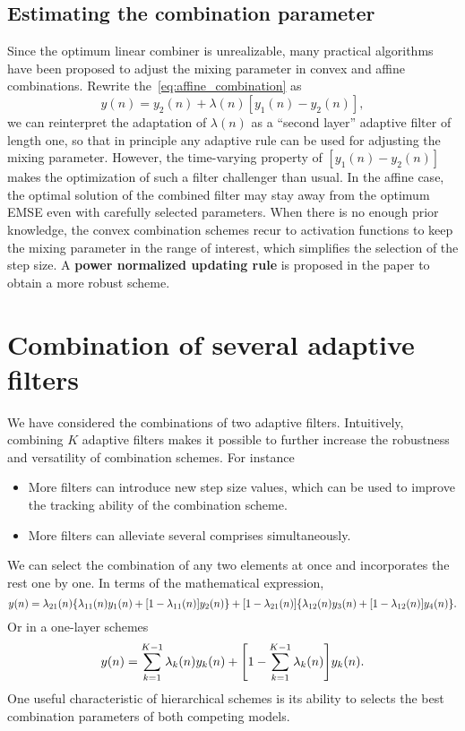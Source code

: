 \documentclass{article}
\begin{document}
\subsection{Estimating the combination parameter}\label{sec:estimating}
Since the optimum linear combiner is unrealizable, many practical algorithms have been proposed to adjust the mixing parameter in convex and affine combinations. Rewrite the~\cref{eq:affine_combination} as
\begin{equation}
    y(n) = y_2(n)+\lambda(n)[y_1(n)-y_2(n)],
\end{equation}
we can reinterpret the adaptation of $\lambda(n)$ as a ``second layer'' adaptive filter of length one, so that in principle any adaptive rule can be used for adjusting the mixing parameter. However, the time-varying property of $[y_1(n)-y_2(n)]$ makes the optimization of such a filter challenger than usual. In the affine case, the optimal solution of the combined filter may stay away from the optimum EMSE even with carefully selected parameters. When there is no enough prior knowledge, the convex combination schemes recur to activation functions to keep the mixing parameter in the range of interest, which simplifies the selection of the step size. A \textbf{power normalized updating rule} is proposed in the paper to obtain a more robust scheme.

\section{Combination of several adaptive filters}
We have considered the combinations of two adaptive filters. Intuitively, combining $K$ adaptive filters makes it possible to further increase the robustness and versatility of combination schemes. For instance
\begin{itemize}
    \item More filters can introduce new step size values, which can be used to improve the tracking ability of the combination scheme.
    \item More filters can alleviate several comprises simultaneously. 
\end{itemize}

We can select the combination of any two elements at once and incorporates the rest one by one. In terms of the mathematical expression,
\begin{equation}
    y(n) =\lambda_{21}(n)\braces*{\lambda_{11}(n)y_1(n)+\bracks*{1-\lambda_{11}(n)}y_2(n)}+\bracks*{1-\lambda_{21}(n)}\braces*{\lambda_{12}(n)y_3(n)+\bracks*{1-\lambda_{12}(n)}y_4(n)}.
\end{equation}
Or in a one-layer schemes
\begin{equation}
    y(n)=\sum_{k=1}^{K-1}\lambda_k(n)y_k(n)+\bracks*{1-\sum_{k=1}^{K-1}\lambda_k(n)}y_k(n).
\end{equation}
One useful characteristic of hierarchical schemes is its ability to selects the best combination parameters of both competing models.
\end{document}
